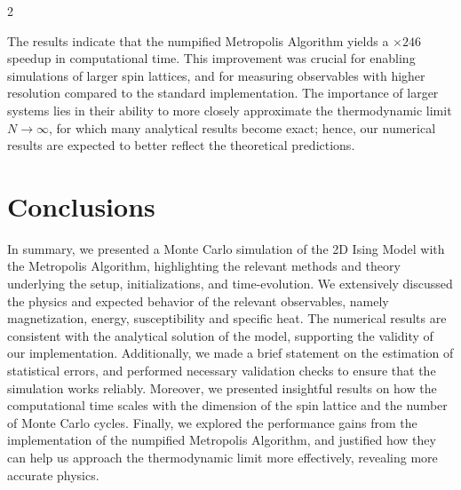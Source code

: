 \documentclass{article}
\begin{document}
\begin{multicols}{2}

The results indicate that the numpified Metropolis Algorithm yields a $\times 246$ speedup in computational time. This improvement was crucial for enabling simulations of larger spin lattices, and for measuring observables with higher resolution compared to the standard implementation. The importance of larger systems lies in their ability to more closely approximate the thermodynamic limit $N \to \infty$, for which many analytical results become exact; hence, our numerical results are expected to better reflect the theoretical predictions.


\section{Conclusions}

In summary, we presented a Monte Carlo simulation of the 2D Ising Model with the Metropolis Algorithm, highlighting the relevant methods and theory underlying the setup, initializations, and time-evolution. We extensively discussed the physics and expected behavior of the relevant observables, namely magnetization, energy, susceptibility and specific heat. The numerical results are consistent with the analytical solution of the model, supporting the validity of our implementation. Additionally, we made a brief statement on the estimation of statistical errors, and performed necessary validation checks to ensure that the simulation works reliably. Moreover, we presented insightful results on how the computational time scales with the dimension of the spin lattice and the number of Monte Carlo cycles. Finally, we explored the performance gains from the implementation of the numpified Metropolis Algorithm, and justified how they can help us approach the thermodynamic limit more effectively, revealing more accurate physics.



\end{multicols}
\end{document}
